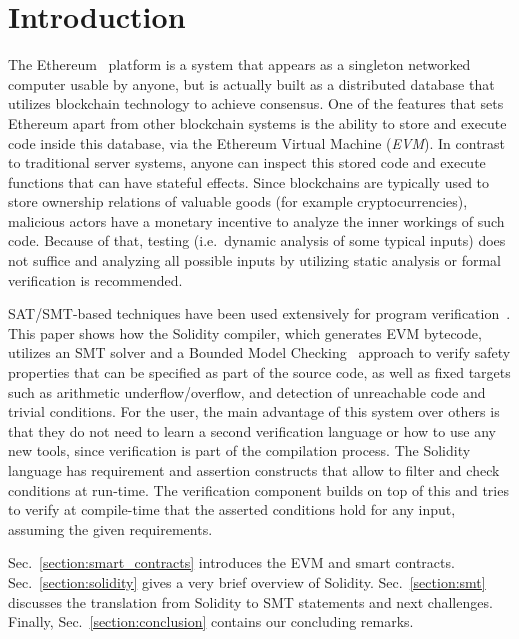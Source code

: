 \section{Introduction}
The Ethereum~\cite{WhitePaper} platform is a system that appears as a
singleton networked computer usable by anyone, but is actually built as a
distributed database that utilizes blockchain technology to achieve consensus.
%
One of the features that sets Ethereum apart from other blockchain systems is
the ability to store and execute code inside this database, via the Ethereum
Virtual Machine (\emph{EVM}).
%
In contrast to traditional server systems, anyone can inspect this stored code
and execute functions that can have stateful effects.
%
Since blockchains are typically used to store ownership relations of valuable goods
(for example
cryptocurrencies),
malicious actors have a monetary incentive to analyze the inner
workings of such code. Because of that, testing (i.e.\  dynamic analysis of some
typical inputs) does not suffice and analyzing all possible inputs by utilizing
static analysis or formal verification is recommended.

SAT/SMT-based techniques have been used extensively for program 
verification~\cite{Biere99,Donaldson11,Komuravelli13,Beyer11,Kroening14,Alt17}.
%
This paper shows how the Solidity compiler, which generates EVM bytecode,
utilizes an SMT solver and a Bounded Model Checking~\cite{Biere99} approach to
verify safety properties that can be specified as part of the source code, as
well as fixed targets such as arithmetic underflow/overflow, and detection of
unreachable code and trivial conditions.
%
For the user, the main advantage of this system over others is that they do not
need to learn a second verification language or how to use any new tools, since
verification is part of the compilation process.
%
The Solidity language has requirement and assertion constructs that allow to
filter and check conditions at run-time.  The verification component
builds on top of this and tries to
verify at compile-time that the asserted conditions hold for any input,
assuming the given requirements.

Sec.~\ref{section:smart_contracts} introduces the EVM and smart contracts.
Sec.~\ref{section:solidity} gives a very brief overview of Solidity. Sec.~\ref{section:smt} discusses the translation from Solidity to SMT
statements and next challenges. Finally, Sec.~\ref{section:conclusion}
contains our concluding remarks.

